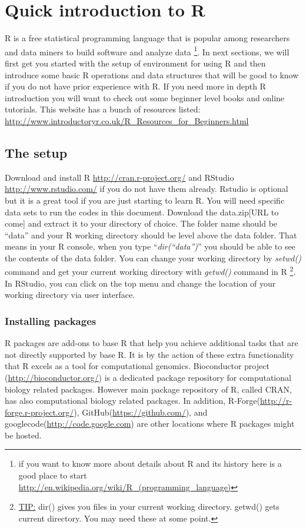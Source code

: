 \documentclass[english,nohyper]{tufte-book}\usepackage[]{graphicx}\usepackage[]{color}
\begin{document}
\chapter{Quick introduction to R}

R is a free statistical programming language that is popular among
researchers and data miners to build software and analyze data%
\footnote{if you want to know more about details about R and its history here
is a good place to start \url{http://en.wikipedia.org/wiki/R_(programming_language)}%
}. In next sections, we will first get you started with the setup of
environment for using R and then introduce some basic R operations
and data structures that will be good to know if you do not have prior
experience with R. If you need more in depth R introduction you will
want to check out some beginner level books and online tutorials.
This website has a bunch of resources listed: \url{http://www.introductoryr.co.uk/R_Resources_for_Beginners.html}


\section{The setup}

Download and install R \url{http://cran.r-project.org/} and RStudio
\url{http://www.rstudio.com/} if you do not have them already. Rstudio
is optional but it is a great tool if you are just starting to learn
R. You will need specific data sets to run the codes in this document.
Download the data.zip{[}URL to come{]} and extract it to your directory
of choice. The folder name should be ``data'' and your R working
directory should be level above the data folder. That means in your
R console, when you type ``\emph{dir(``data'')}'' you should be
able to see the contents of the data folder. You can change your working
directory by \emph{setwd()} command and get your current working directory
with \emph{getwd()} command in R%
\footnote{\uline{TIP:} dir() gives you files in your current working directory.
getwd() gets current directory. You may need these at some point. %
}. In RStudio, you can click on the top menu and change the location
of your working directory via user interface.


\subsection{Installing packages}

R packages are add-ons to base R that help you achieve additional
tasks that are not directly supported by base R. It is by the action
of these extra functionality that R excels as a tool for computational
genomics. Bioconductor project (\url{http://bioconductor.org/}) is
a dedicated package repository for computational biology related packages.
However main package repository of R, called CRAN, has also computational
biology related packages. In addition, R-Forge(\url{http://r-forge.r-project.org/}),
GitHub(\url{https://github.com/}), and googlecode(\url{http://code.google.com})
are other locations where R packages might be hosted.
\end{document}
